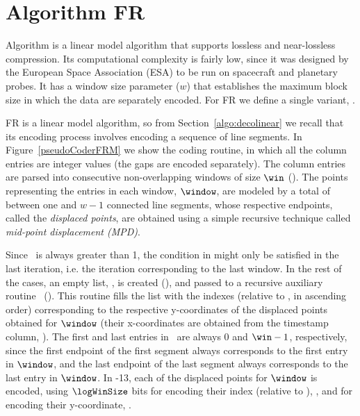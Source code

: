 
\section{Algorithm FR}
\label{algo:fr}


Algorithm \textit{\FRfull} \cite{coder:fr} is a linear model algorithm that supports lossless and near-lossless compression. Its computational complexity is fairly low, since it was designed by the European Space Association (ESA) to be run on spacecraft and planetary probes. It has a window size parameter ($w$) that establishes the maximum block size in which the data are separately encoded. For FR we define a single variant, \maskalgo.

FR is a linear model algorithm, so from Section~\ref{algo:decolinear} we recall that its encoding process involves encoding a sequence of line segments. In Figure~\ref{pseudoCoderFRM} we show the coding routine, in which all the column entries are integer values (the gaps are encoded separately). The column entries are parsed into consecutive non-overlapping windows of size $\win$ (). The points representing the entries in each window, $\window$, are modeled by a total of between one and $w-1$ connected line segments, whose respective endpoints, called the \textit{displaced points}, are obtained using a simple recursive technique called \textit{mid-point displacement (MPD)}.


Since \win\ is always greater than 1, the condition in  might only be satisfied in the last iteration, i.e. the iteration corresponding to the last window. In the rest of the cases, an empty list, \disPoints, is created (), and passed to a recursive auxiliary routine \getDisplacedPointsMethod\ (). This routine fills the list with the indexes (relative to \window, in ascending order) corresponding to the respective y-coordinates of the displaced points obtained for $\window$ (their x-coordinates are obtained from the timestamp column, \tscol). The first and last entries in \disPoints\ are always 0 and $\win-1$, respectively, since the first endpoint of the first segment always corresponds to the first entry in $\window$, and the last endpoint of the last segment always corresponds to the last entry in $\window$. In -13, each of the displaced points for $\window$ is encoded, using $\logWinSize$ bits for encoding their index (relative to \window), \indexx, and \tobitexp for encoding their y-coordinate, \winIndex.


\clearpage


